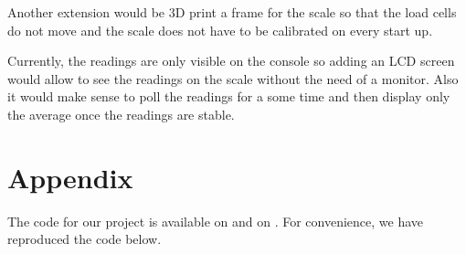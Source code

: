 \documentclass[letterpaper,11pt]{article}
\newcommand{\myLink}[2]{\href{#1}{\color{blue}\underline{\smash{\texttt{#2}}}}}
\begin{document}
Another extension would be 3D print a frame for the scale so that the load cells
do not move and the scale does not have to be calibrated on every start up.

Currently, the readings are only visible on the console so adding an LCD screen
would allow to see the readings on the scale without the need of a monitor. Also
it would make sense to poll the readings for a some time and then display only
the average once the readings are stable.

\newpage
\section{Appendix}

The code for our project is available on
\myLink{https://github.com/SohamKaranjikar/WeightScaleProject}{GitHub} and on
\myLink{https://gitlab.engr.illinois.edu/cs-431-spring-2020/4crprojects/itj2\_sohammk2}{GitLab}. For
convenience, we have reproduced the code below.





\end{document}
